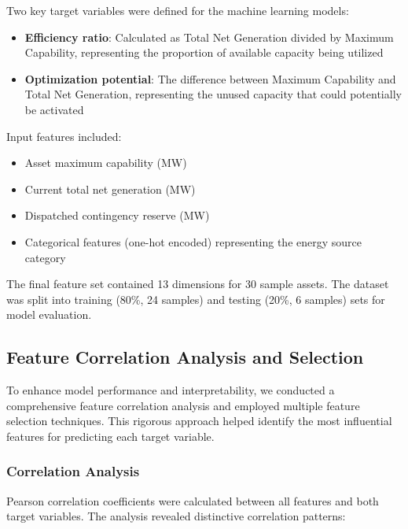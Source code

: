 \documentclass[12pt,a4paper]{article}
\begin{document}
Two key target variables were defined for the machine learning models:

\begin{itemize}
    \item \textbf{Efficiency ratio}: Calculated as Total Net Generation divided by Maximum Capability, representing the proportion of available capacity being utilized
    \item \textbf{Optimization potential}: The difference between Maximum Capability and Total Net Generation, representing the unused capacity that could potentially be activated
\end{itemize}

Input features included:
\begin{itemize}
    \item Asset maximum capability (MW)
    \item Current total net generation (MW)
    \item Dispatched contingency reserve (MW)
    \item Categorical features (one-hot encoded) representing the energy source category
\end{itemize}

The final feature set contained 13 dimensions for 30 sample assets. The dataset was split into training (80\%, 24 samples) and testing (20\%, 6 samples) sets for model evaluation.

\subsection{Feature Correlation Analysis and Selection}

To enhance model performance and interpretability, we conducted a comprehensive feature correlation analysis and employed multiple feature selection techniques. This rigorous approach helped identify the most influential features for predicting each target variable.

\subsubsection{Correlation Analysis}

Pearson correlation coefficients were calculated between all features and both target variables. The analysis revealed distinctive correlation patterns:
\end{document}
